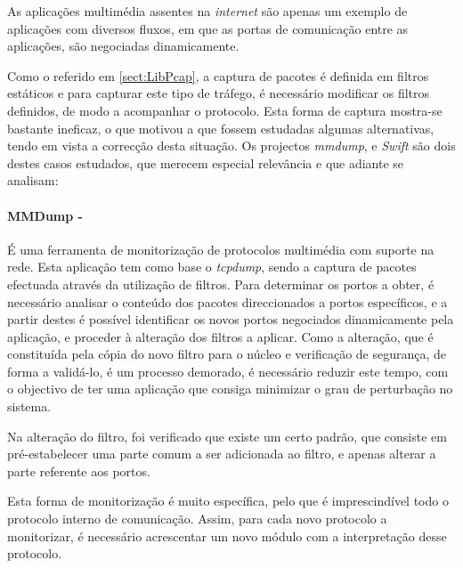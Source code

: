 As aplicações multimédia assentes na \textit{internet} são apenas um exemplo de aplicações com diversos fluxos, em que as portas de comunicação entre as aplicações, são negociadas dinamicamente.

Como o referido em \ref{sect:LibPcap}, a captura de pacotes é definida em filtros estáticos e para capturar este tipo de tráfego, é necessário modificar os filtros definidos, de modo a acompanhar o protocolo.
Esta forma de captura mostra-se bastante ineficaz, o que motivou a que fossem estudadas algumas alternativas, tendo em vista a correcção desta situação.
Os projectos \textit{mmdump}\cite{505678}, %
e \textit{Swift}\cite{1387609} são dois destes casos estudados, que merecem especial relevância e que adiante se analisam:

\paragraph*{MMDump - } É uma ferramenta de monitorização de protocolos multimédia com suporte na rede.
Esta aplicação tem como base o \textit{tcpdump}, sendo a captura de pacotes efectuada através da utilização de filtros.
Para determinar os portos a obter, é necessário analisar o conteúdo dos pacotes direccionados a portos específicos, e a partir destes é possível identificar os novos portos negociados dinamicamente pela aplicação, e proceder à alteração dos filtros a aplicar.
Como a alteração, que é constituída pela cópia do novo filtro para o núcleo e verificação de segurança, de forma a validá-lo, é um processo demorado, é necessário reduzir este tempo, com o objectivo de ter uma aplicação que consiga minimizar o grau de perturbação no sistema.

Na alteração do filtro, foi verificado que existe um certo padrão, que consiste em pré-estabelecer uma parte comum a ser adicionada ao filtro, e apenas alterar a parte referente aos portos.

Esta forma de monitorização é muito específica, pelo que é imprescindível todo o protocolo interno de comunicação.
Assim, para cada novo protocolo a monitorizar, é necessário acrescentar um novo módulo com a interpretação desse protocolo.


